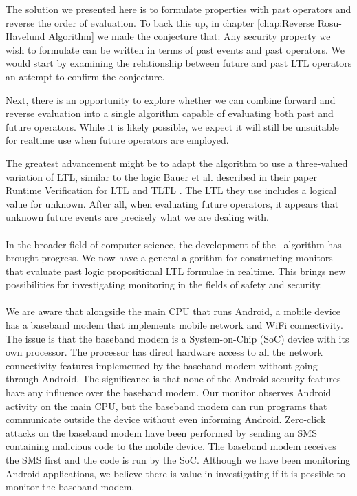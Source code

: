 The solution we presented here is to formulate properties with past operators and reverse the order of evaluation. To back this up, in chapter \ref{chap:Reverse Rosu-Havelund Algorithm} we made the conjecture that: Any security property we wish to formulate can be written in terms of past events and past operators.  We would start by examining the relationship between future and past LTL operators an attempt to confirm the conjecture.

Next, there is an opportunity to explore whether we can combine forward and reverse evaluation into a single algorithm capable of evaluating both past and future operators.  While it is likely possible, we expect it will still be unsuitable for realtime use when future operators are employed.

The greatest advancement might be to adapt the algorithm to use a three-valued variation of LTL, similar to the logic Bauer et al. described in their paper Runtime Verification for LTL and TLTL \cite{RVForLTLAndTLTL}.  The LTL they use includes a logical value for unknown.  After all, when evaluating future operators, it appears that unknown future events are precisely what we are dealing with.\\
\\
\noindent
In the broader field of computer science, the development of the \RRH\ algorithm has brought progress.  We now have a general algorithm for constructing monitors that evaluate past logic propositional LTL formulae in realtime.  This brings new possibilities for investigating monitoring in the fields of safety and security.\\
\\
\noindent
We are aware that alongside the main CPU that runs Android, a mobile device has a baseband modem that implements mobile network and WiFi connectivity.  The issue is that the baseband modem is a System-on-Chip (SoC) device with its own processor.  The processor has direct hardware access to all the network connectivity features implemented by the baseband modem without going through Android.  The significance is that none of the Android security features have any influence over the baseband modem.  Our monitor observes Android activity on the main CPU, but the baseband modem can run programs that communicate outside the device without even informing Android.  Zero-click attacks on the baseband modem have been performed by sending an SMS containing malicious code to the mobile device.  The baseband modem receives the SMS first and the code is run by the SoC.  Although we have been monitoring Android applications, we believe there is value in investigating if it is possible to monitor the baseband modem.